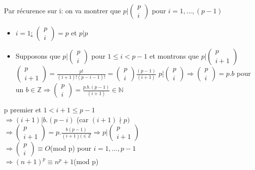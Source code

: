 \documentclass[11pt]{article}
\begin{document}
					Par récurence sur i: on va montrer que $p | \begin{pmatrix}p\\i\end{pmatrix}$ pour $i=1,...,(p-1)$
					\begin{itemize}
		 				\item \underline{$i=1$:} $\begin{pmatrix}p\\i\end{pmatrix} = p$ et $p |p$
						\item Supposons que $p|\begin{pmatrix}p\\i\end{pmatrix}$ pour $1 \leq i < p-1$ et montrons que $p |\begin{pmatrix}p\\i+1\end{pmatrix}$\\
			 			$\begin{pmatrix}p\\i+1\end{pmatrix} = \frac{p!}{(i+1)! (p-i-1)!} = \begin{pmatrix}p\\i\end{pmatrix}\frac{(p-1)}{(i+1)}$
			 			$p|\begin{pmatrix}p\\i\end{pmatrix} \Rightarrow \begin{pmatrix}p\\i\end{pmatrix} = p.b$ pour un $b \in \mathbb{Z} \Rightarrow \begin{pmatrix}p\\i\end{pmatrix} = \frac{p.b.(p-1)}{(i+1)} \in \mathbb{N}$
					\end{itemize}
			
					p premier et $1 < i+1 \leq p-1$\\
					$\Rightarrow (i+1) | b.(p-i)$ (car $(i+1) \nmid p)$\\
					$\Rightarrow \begin{pmatrix}p\\i+1\end{pmatrix} = p.\frac{b(p-1)}{(i+1) (\in \mathbb{Z}} \Rightarrow p | \begin{pmatrix}p\\i+1\end{pmatrix}$ \\
					$\Rightarrow \begin{pmatrix}p\\i\end{pmatrix} \equiv O$(mod p) pour $i=1,...,p-1$\\
					$\Rightarrow (n+1)^p \equiv n^p + 1$(mod p)
				
\end{document}
